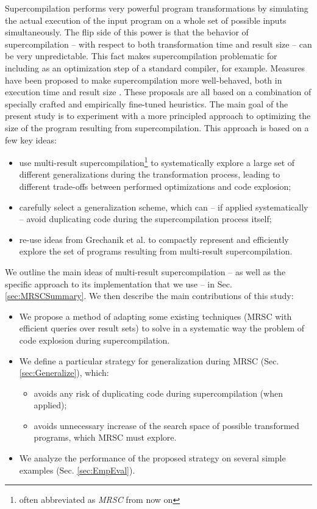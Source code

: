 \documentclass[submission,copyright,creativecommons]{eptcs}
\begin{document}
Supercompilation performs very powerful program transformations by simulating
the actual execution of the input program on a whole set of possible inputs
simultaneously.
The flip side of this power is that the behavior of supercompilation -- 
with respect to both transformation time and result size --
can be very unpredictable.
This fact makes supercompilation problematic for including as an
optimization step of a standard compiler, for example.
Measures have been proposed to make supercompilation more
well-behaved, both in execution time and result size \cite{bolingbroke2011improving,Jonsson2011Taming}.
These proposals are all based on a combination of specially crafted and
empirically fine-tuned heuristics.
The main goal of the present study is to experiment with a more
principled approach to optimizing the size of the program resulting
from supercompilation.
This approach is based on a few key ideas:
\begin{itemize}
  \item use multi-result supercompilation\footnote{often abbreviated as \emph{MRSC} from now on} 
    \cite{KlyuchnikovMRSCBranch,Klyuchnikov:META2012:MRSC,Romanenko2014StagedMRSC}
    to systematically explore a large set of different generalizations during 
    the transformation process, 
    leading to different trade-offs between performed optimizations and code explosion;
  \item carefully select a generalization scheme, which can -- if applied systematically -- avoid duplicating
    code during the supercompilation process itself;
  \item re-use ideas from Grechanik et al. \cite{Romanenko2014StagedMRSC} to compactly represent and efficiently
    explore the set of programs resulting from multi-result supercompilation.
\end{itemize}
We outline the main ideas of multi-result supercompilation --
as well as the specific approach to its implementation that we use --
in Sec. \ref{sec:MRSCSummary}. We then describe the main contributions of this study:
\begin{itemize}
  \item We propose a method of adapting some existing techniques (MRSC with
    efficient queries over result sets)
    to solve in a systematic way the problem of code explosion during supercompilation.
  \item We define a particular strategy for generalization during MRSC (Sec. \ref{sec:Generalize}), which:
    \begin{itemize}
      \item avoids any risk of duplicating code during supercompilation (when applied);
      \item avoids unnecessary increase of the search space of possible
        transformed programs, which MRSC must explore.
    \end{itemize}
  \item We analyze the performance of the proposed strategy on several
    simple examples (Sec. \ref{sec:EmpEval}).
\end{itemize}
\end{document}
